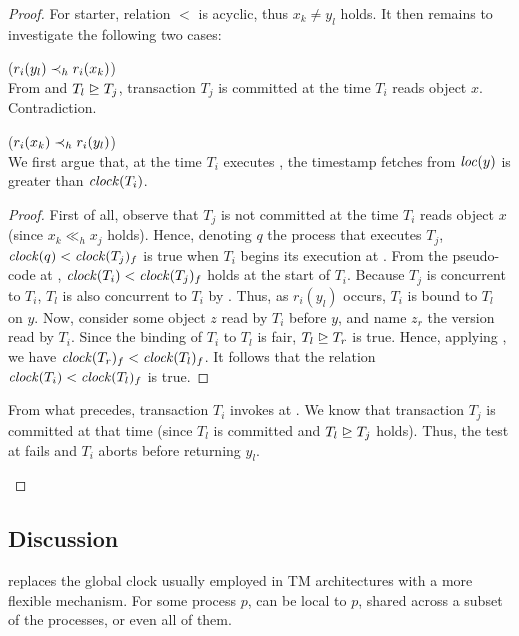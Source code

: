 \begin{proof}
  For starter, relation $<$ is acyclic, thus $x_k \neq y_l$ holds.  
  It then remains to investigate the following two cases:
  \begin{compactitem}
  \item ($r_i(y_l) \hb_h r_i(x_k)$)\\
    From  and $T_l \mathrel{\unrhd} T_j$, transaction $T_j$ is committed at the time $T_i$ reads object $x$.
    Contradiction.
  \item ($r_i(x_k) \hb_h r_i(y_l)$)\\
    We first argue that, at the time $T_i$ executes , the timestamp fetches from $\locationOf{y}$ is greater than $\clockOf{T_i}$.
    \begin{proof}
      First of all, observe that $T_j$ is not committed at the time $T_i$ reads object $x$ (since $x_{k} \ll_h x_{j}$ holds).
      Hence, denoting $q$ the process that executes $T_j$, $\clockOf{q} < \clockOf{T_j}_f$ is true when $T_i$ begins its execution at .
      From the pseudo-code at , $\clockOf{T_i} < \clockOf{T_j}_f$ holds at the start of $T_i$.
      Because $T_j$ is concurrent to $T_i$, $T_l$ is also concurrent to $T_i$ by .
      Thus, as $r_i(y_l)$ occurs, $T_i$ is bound to $T_l$ on $y$.
      Now, consider some object $z$ read by $T_i$ before $y$, and name $z_r$ the version read by $T_i$.
      Since the binding of $T_i$ to $T_l$ is fair, $T_l \mathrel{\unrhd} T_r$ is true.
      Hence, applying , we have $\clockOf{T_r}_f < \clockOf{T_l}_f$.
      It follows that the relation $\clockOf{T_i} < \clockOf{T_l}_f$ is true.
    \end{proof}
    From what precedes, transaction $T_i$ invokes \stmExtendFunction at .
    We know that transaction $T_j$ is committed at that time (since $T_l$ is committed and $T_l \mathrel{\unrhd} T_j$ holds).
    Thus, the test at  fails and $T_i$ aborts before returning $y_l$.
  \end{compactitem}
\end{proof}

\subsection{Discussion}

 replaces the global clock usually employed in TM architectures with a more flexible mechanism.
For some process $p$,  can be local to $p$, shared across a subset of the processes, or even all of them.

